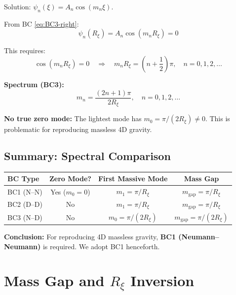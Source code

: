 \documentclass[11pt,a4paper]{article}
\newcommand{\Rxi}{R_\xi}
\newcommand{\mgap}{m_{\mathrm{gap}}}
\begin{document}
Solution: $\psi_n(\xi) = A_n \cos(m_n \xi)$.

From BC \eqref{eq:BC3-right}:
\begin{equation}
\psi_n(\Rxi) = A_n \cos(m_n \Rxi) = 0
\label{eq:BC3-right-applied}
\end{equation}

This requires:
\begin{equation}
\cos(m_n \Rxi) = 0 \quad \Rightarrow \quad m_n \Rxi = \left(n + \frac{1}{2}\right)\pi, \quad n = 0, 1, 2, \ldots
\label{eq:BC3-quantization}
\end{equation}

\textbf{Spectrum (BC3):}
\begin{equation}
\boxed{m_n = \frac{(2n+1)\pi}{2\Rxi}, \quad n = 0, 1, 2, \ldots}
\label{eq:spectrum-BC3}
\end{equation}

\textbf{No true zero mode:} The lightest mode has $m_0 = \pi/(2\Rxi) \neq 0$.
This is problematic for reproducing massless 4D gravity.

\subsection{Summary: Spectral Comparison}

\begin{center}
\begin{tabular}{lccc}
\toprule
\textbf{BC Type} & \textbf{Zero Mode?} & \textbf{First Massive Mode} & \textbf{Mass Gap} \\
\midrule
BC1 (N--N) & Yes ($m_0 = 0$) & $m_1 = \pi/\Rxi$ & $\mgap = \pi/\Rxi$ \\
BC2 (D--D) & No & $m_1 = \pi/\Rxi$ & $\mgap = \pi/\Rxi$ \\
BC3 (N--D) & No & $m_0 = \pi/(2\Rxi)$ & $\mgap = \pi/(2\Rxi)$ \\
\bottomrule
\end{tabular}
\end{center}

\textbf{Conclusion:} For reproducing 4D massless gravity, \textbf{BC1 (Neumann--Neumann)}
is required. We adopt BC1 henceforth.

\section{Mass Gap and $\Rxi$ Inversion}
\end{document}
